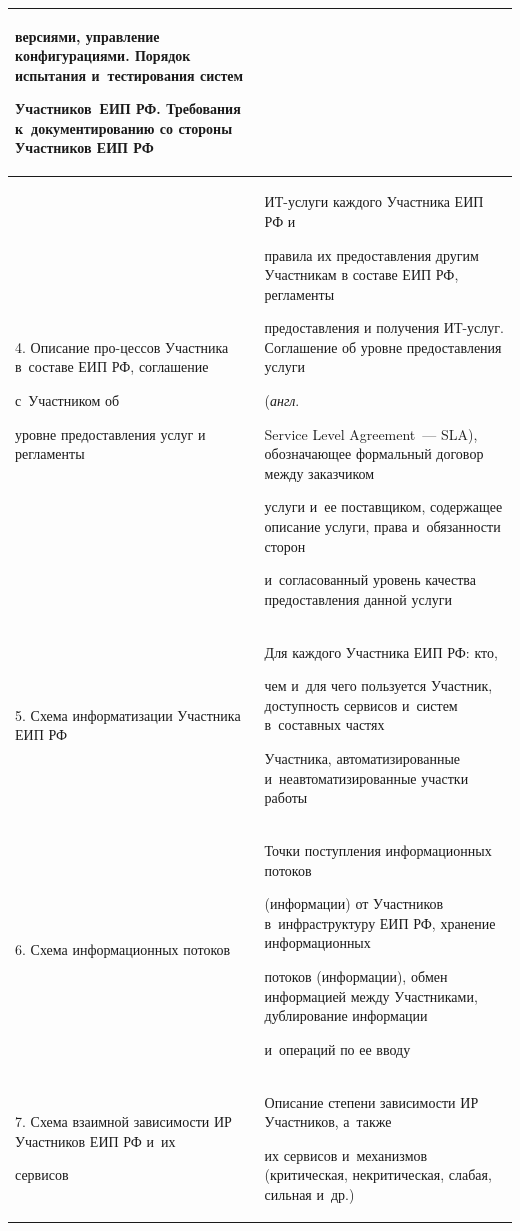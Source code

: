 \begin{table}
\begin{center}
\begin{tabular}{|p{26mm}|p{95mm}|}
версиями, управление конфигурациями. Порядок испытания и~тестирования систем

Участников~ЕИП РФ. Требования к~документированию со стороны Участников ЕИП РФ\\

\hline

4. Описание про-\newline цес\-сов Участника в~со\-ста\-ве ЕИП РФ, соглашение

с~Участником об\newline

уровне предо\-став\-ле\-ния услуг и регламенты&ИТ-услуги каждого Участника ЕИП РФ и

правила их предо\-став\-ле\-ния другим Участникам в составе ЕИП РФ, регламенты

предоставления и получения ИТ-услуг. Соглашение об уровне предоставления услуги

(\textit{англ}.\

Service Level Agreement~--- SLA), обозначающее формальный договор между заказчиком

услуги и~ее поставщиком, содержащее описание услуги, права и~обязанности сторон

и~согласованный уровень качества предоставления данной услуги\\

\hline

5. Схема информатизации Участника ЕИП РФ &Для каждого Участника ЕИП РФ: кто,

чем и~для чего пользуется Участник, доступность сервисов и~систем в~составных частях

Участника, автоматизированные и~неавтоматизированные участки работы\\

\hline

6. Схема информационных потоков&Точки поступления информационных потоков

(информации) от Участников в~инфраструктуру ЕИП РФ, хранение информационных

потоков (информации), обмен информацией между Участниками, дублирование информации

и~операций по ее вводу\\

\hline

7. Схема взаим\-ной зависимости ИР Участников ЕИП РФ и~их

сервисов &Описание степени зависимости ИР Участников, а~также

их сервисов и~механизмов (критическая, некритическая, слабая, сильная и~др.)\\

\hline

\end{tabular}

\end{center}

\end{table}



